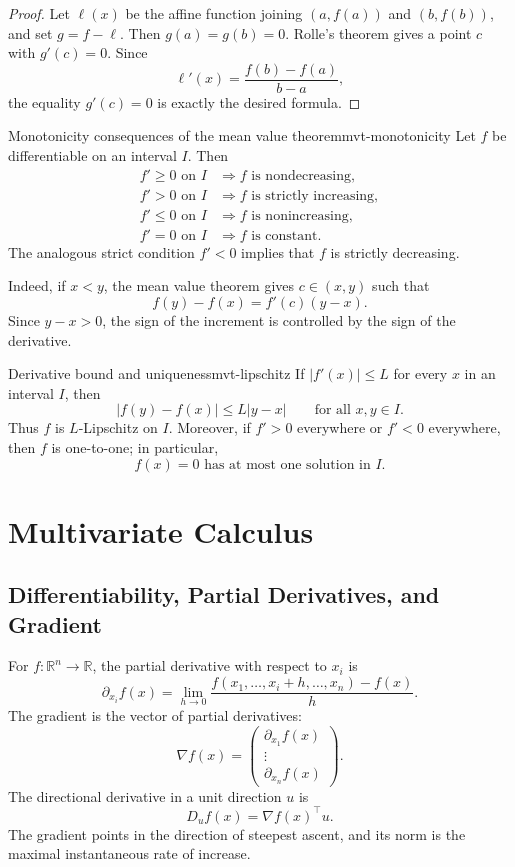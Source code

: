 \documentclass[11pt]{article}
\newcommand{\R}{\mathbb{R}}
\theoremstyle{definition}
\theoremstyle{plain}
\theoremstyle{remark}
\begin{document}
\begin{proof}
Let $\ell(x)$ be the affine function joining $(a,f(a))$ and $(b,f(b))$, and set
$g=f-\ell$. Then $g(a)=g(b)=0$. Rolle's theorem gives a point $c$ with
$g'(c)=0$. Since
\[
\ell'(x)=\frac{f(b)-f(a)}{b-a},
\]
the equality $g'(c)=0$ is exactly the desired formula.
\end{proof}

\begin{keyproposition}{Monotonicity consequences of the mean value theorem}{mvt-monotonicity}
Let $f$ be differentiable on an interval $I$. Then
\[
\boxed{
\begin{aligned}
f'\geq0\text{ on }I&\Longrightarrow f\text{ is nondecreasing},\\
f'>0\text{ on }I&\Longrightarrow f\text{ is strictly increasing},\\
f'\leq0\text{ on }I&\Longrightarrow f\text{ is nonincreasing},\\
f'=0\text{ on }I&\Longrightarrow f\text{ is constant}.
\end{aligned}}
\]
The analogous strict condition $f'<0$ implies that $f$ is strictly decreasing.
\end{keyproposition}

Indeed, if $x<y$, the mean value theorem gives $c\in(x,y)$ such that
\[
f(y)-f(x)=f'(c)(y-x).
\]
Since $y-x>0$, the sign of the increment is controlled by the sign of the
derivative.

\begin{keyproposition}{Derivative bound and uniqueness}{mvt-lipschitz}
If $|f'(x)|\leq L$ for every $x$ in an interval $I$, then
\[
\boxed{|f(y)-f(x)|\leq L|y-x|\qquad\text{for all }x,y\in I.}
\]
Thus $f$ is $L$-Lipschitz on $I$. Moreover, if $f'>0$ everywhere or $f'<0$
everywhere, then $f$ is one-to-one; in particular,
\[
\boxed{f(x)=0\text{ has at most one solution in }I.}
\]
\end{keyproposition}

\section{Multivariate Calculus}

\subsection{Differentiability, Partial Derivatives, and Gradient}

For $f:\R^n\to\R$, the partial derivative with respect to $x_i$ is
\[
\partial_{x_i}f(x)
=
\lim_{h\to0}
\frac{f(x_1,\ldots,x_i+h,\ldots,x_n)-f(x)}{h}.
\]
The gradient is the vector of partial derivatives:
\[
\nabla f(x)=
\begin{pmatrix}
\partial_{x_1}f(x)\\
\vdots\\
\partial_{x_n}f(x)
\end{pmatrix}.
\]
The directional derivative in a unit direction $u$ is
\[
D_uf(x)=\nabla f(x)^\top u.
\]
The gradient points in the direction of steepest ascent, and its norm is the
maximal instantaneous rate of increase.
\end{document}
